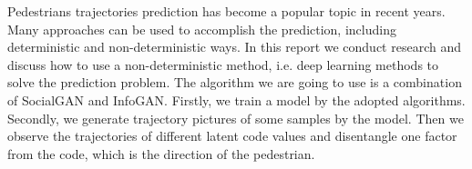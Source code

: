 Pedestrians trajectories prediction has become a popular topic in recent years. Many approaches can be used to accomplish the prediction, including deterministic and non-deterministic ways. In this report we conduct research and discuss how to use a non-deterministic method, i.e. deep learning methods to solve the prediction problem. The algorithm we are going to use is a combination of SocialGAN and InfoGAN. Firstly, we train a model by the adopted algorithms. Secondly, we generate trajectory pictures of some samples by the model. Then we observe the trajectories of different latent code values and disentangle one factor from the code, which is the direction of the pedestrian.